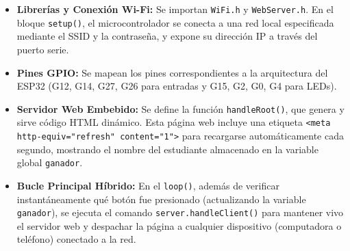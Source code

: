 \documentclass[12pt,a4paper]{article}
\begin{document}
\begin{itemize}
    \item \textbf{Librerías y Conexión Wi-Fi:} Se importan \texttt{WiFi.h} y \texttt{WebServer.h}. En el bloque \texttt{setup()}, el microcontrolador se conecta a una red local especificada mediante el SSID y la contraseña, y expone su dirección IP a través del puerto serie.
    \item \textbf{Pines GPIO:} Se mapean los pines correspondientes a la arquitectura del ESP32 (G12, G14, G27, G26 para entradas y G15, G2, G0, G4 para LEDs).
    \item \textbf{Servidor Web Embebido:} Se define la función \texttt{handleRoot()}, que genera y sirve código HTML dinámico. Esta página web incluye una etiqueta \texttt{<meta http-equiv="refresh" content="1">} para recargarse automáticamente cada segundo, mostrando el nombre del estudiante almacenado en la variable global \texttt{ganador}.
    \item \textbf{Bucle Principal Híbrido:} En el \texttt{loop()}, además de verificar instantáneamente qué botón fue presionado (actualizando la variable \texttt{ganador}), se ejecuta el comando \texttt{server.handleClient()} para mantener vivo el servidor web y despachar la página a cualquier dispositivo (computadora o teléfono) conectado a la red.
\end{itemize}
\end{document}
